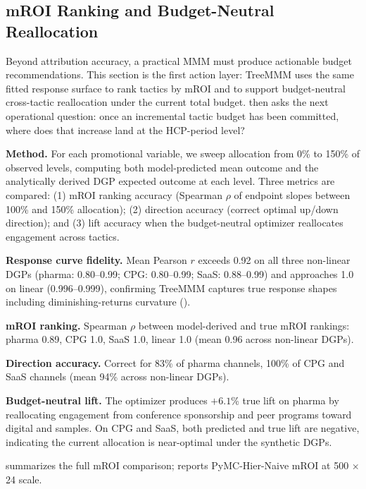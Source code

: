 \documentclass[review,12pt]{elsarticle}
\begin{document}
\clearpage

\subsection{mROI Ranking and Budget-Neutral Reallocation}
\label{sec:results:mroi}

Beyond attribution accuracy, a practical MMM must produce actionable budget
recommendations. This section is the first action layer: TreeMMM uses the same
fitted response surface to rank tactics by mROI and to support budget-neutral
cross-tactic reallocation under the current total budget. 
then asks the next operational question: once an incremental tactic budget has
been committed, where does that increase land at the HCP-period level?

\textbf{Method.} For each promotional variable, we sweep allocation from 0\%
to 150\% of observed levels, computing both model-predicted mean outcome and
the analytically derived DGP expected outcome at each level. Three metrics are
compared: (1) mROI ranking accuracy (Spearman $\rho$ of endpoint slopes between
100\% and 150\% allocation); (2) direction accuracy (correct optimal
up/down direction); and (3) lift accuracy when the budget-neutral optimizer
reallocates engagement across tactics.

\textbf{Response curve fidelity.} Mean Pearson $r$ exceeds 0.92 on all three
non-linear DGPs (pharma: 0.80--0.99; CPG: 0.80--0.99; SaaS: 0.88--0.99) and
approaches 1.0 on linear (0.996--0.999), confirming TreeMMM captures true
response shapes including diminishing-returns curvature
().

\textbf{mROI ranking.} Spearman $\rho$ between model-derived and true mROI
rankings: pharma 0.89, CPG 1.0, SaaS 1.0, linear 1.0 (mean 0.96 across
non-linear DGPs).

\textbf{Direction accuracy.} Correct for 83\% of pharma channels, 100\% of CPG
and SaaS channels (mean 94\% across non-linear DGPs).

\textbf{Budget-neutral lift.} The optimizer produces $+6.1$\% true lift on
pharma by reallocating engagement from conference sponsorship and peer programs
toward digital and samples. On CPG and SaaS, both predicted and true lift are
negative, indicating the current allocation is near-optimal under the synthetic
DGPs.

 summarizes the full mROI comparison; 
reports PyMC-Hier-Naive mROI at 500 $\times$ 24 scale.
\end{document}

